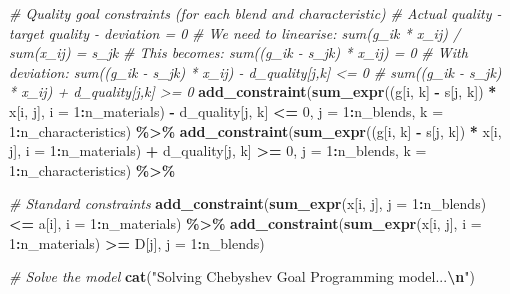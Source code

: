 \documentclass[
]{article}
\newenvironment{Shaded}{\begin{snugshade}}{\end{snugshade}}
\newcommand{\AttributeTok}[1]{\textcolor[rgb]{0.13,0.29,0.53}{#1}}
\newcommand{\CommentTok}[1]{\textcolor[rgb]{0.56,0.35,0.01}{\textit{#1}}}
\newcommand{\DecValTok}[1]{\textcolor[rgb]{0.00,0.00,0.81}{#1}}
\newcommand{\FunctionTok}[1]{\textcolor[rgb]{0.13,0.29,0.53}{\textbf{#1}}}
\newcommand{\NormalTok}[1]{#1}
\newcommand{\SpecialCharTok}[1]{\textcolor[rgb]{0.81,0.36,0.00}{\textbf{#1}}}
\newcommand{\StringTok}[1]{\textcolor[rgb]{0.31,0.60,0.02}{#1}}
\begin{document}
\begin{Shaded}
\begin{Highlighting}[]
  \CommentTok{\# Quality goal constraints (for each blend and characteristic)}
  \CommentTok{\# Actual quality {-} target quality {-} deviation = 0}
  \CommentTok{\# We need to linearise: sum(g\_ik * x\_ij) / sum(x\_ij) = s\_jk}
  \CommentTok{\# This becomes: sum((g\_ik {-} s\_jk) * x\_ij) = 0}
  \CommentTok{\# With deviation: sum((g\_ik {-} s\_jk) * x\_ij) {-} d\_quality[j,k] \textless{}= 0}
  \CommentTok{\#                 sum((g\_ik {-} s\_jk) * x\_ij) + d\_quality[j,k] \textgreater{}= 0}
  \FunctionTok{add\_constraint}\NormalTok{(}\FunctionTok{sum\_expr}\NormalTok{((g[i, k] }\SpecialCharTok{{-}}\NormalTok{ s[j, k]) }\SpecialCharTok{*}\NormalTok{ x[i, j], }\AttributeTok{i =} \DecValTok{1}\SpecialCharTok{:}\NormalTok{n\_materials) }\SpecialCharTok{{-}} 
\NormalTok{                 d\_quality[j, k] }\SpecialCharTok{\textless{}=} \DecValTok{0}\NormalTok{, }
                 \AttributeTok{j =} \DecValTok{1}\SpecialCharTok{:}\NormalTok{n\_blends, }\AttributeTok{k =} \DecValTok{1}\SpecialCharTok{:}\NormalTok{n\_characteristics) }\SpecialCharTok{\%\textgreater{}\%}
  \FunctionTok{add\_constraint}\NormalTok{(}\FunctionTok{sum\_expr}\NormalTok{((g[i, k] }\SpecialCharTok{{-}}\NormalTok{ s[j, k]) }\SpecialCharTok{*}\NormalTok{ x[i, j], }\AttributeTok{i =} \DecValTok{1}\SpecialCharTok{:}\NormalTok{n\_materials) }\SpecialCharTok{+} 
\NormalTok{                 d\_quality[j, k] }\SpecialCharTok{\textgreater{}=} \DecValTok{0}\NormalTok{, }
                 \AttributeTok{j =} \DecValTok{1}\SpecialCharTok{:}\NormalTok{n\_blends, }\AttributeTok{k =} \DecValTok{1}\SpecialCharTok{:}\NormalTok{n\_characteristics) }\SpecialCharTok{\%\textgreater{}\%}
  
  \CommentTok{\# Standard constraints}
  \FunctionTok{add\_constraint}\NormalTok{(}\FunctionTok{sum\_expr}\NormalTok{(x[i, j], }\AttributeTok{j =} \DecValTok{1}\SpecialCharTok{:}\NormalTok{n\_blends) }\SpecialCharTok{\textless{}=}\NormalTok{ a[i], }\AttributeTok{i =} \DecValTok{1}\SpecialCharTok{:}\NormalTok{n\_materials) }\SpecialCharTok{\%\textgreater{}\%}
  \FunctionTok{add\_constraint}\NormalTok{(}\FunctionTok{sum\_expr}\NormalTok{(x[i, j], }\AttributeTok{i =} \DecValTok{1}\SpecialCharTok{:}\NormalTok{n\_materials) }\SpecialCharTok{\textgreater{}=}\NormalTok{ D[j], }\AttributeTok{j =} \DecValTok{1}\SpecialCharTok{:}\NormalTok{n\_blends)}

\CommentTok{\# Solve the model}
\FunctionTok{cat}\NormalTok{(}\StringTok{"Solving Chebyshev Goal Programming model...}\SpecialCharTok{\textbackslash{}n}\StringTok{"}\NormalTok{)}
\end{Highlighting}
\end{Shaded}
\end{document}
